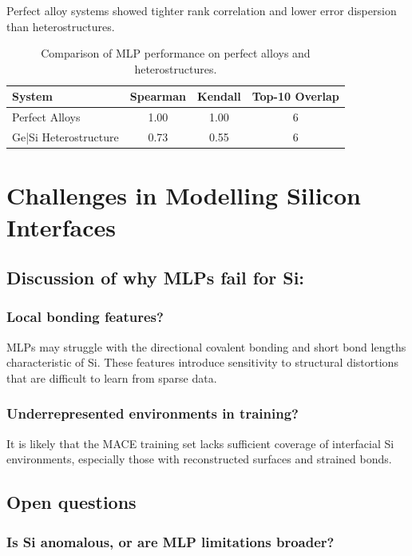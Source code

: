 Perfect alloy systems showed tighter rank correlation and lower error dispersion than heterostructures.

\begin{table}[h]
    \centering
    \caption{Comparison of MLP performance on perfect alloys and heterostructures.}
    \begin{tabular}{lccc}
        System & Spearman & Kendall & Top-10 Overlap \\
        \hline
        Perfect Alloys & 1.00 & 1.00 & 6 \\
        Ge|Si Heterostructure & 0.73 & 0.55 & 6 \\
    \end{tabular}
\end{table}

\section{Challenges in Modelling Silicon Interfaces}
\label{section:challenges_in_modelling_silicon_interfaces}

\subsection{Discussion of why MLPs fail for Si:}

\subsubsection{Local bonding features?}

MLPs may struggle with the directional covalent bonding and short bond lengths characteristic of Si. These features
introduce sensitivity to structural distortions that are difficult to learn from sparse data.

\subsubsection{Underrepresented environments in training?}

It is likely that the MACE training set lacks sufficient coverage of interfacial Si environments, especially those with
reconstructed surfaces and strained bonds.

\subsection{Open questions}

\subsubsection{Is Si anomalous, or are MLP limitations broader?}

